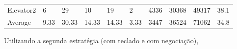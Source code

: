 \documentclass[a4paper]{article}
\begin{document}
\begin{table}[h]
\begin{tabular}{@{}llllllllll@{}}
Elevator2 & 6        & 29            & 10           & 19                                                               & 2                                                                  & 4336                                                         & 30368                                                 & 49317                                                   & 38.1         \\
Average   & 9.33     & 30.33         & 14.33        & 14.33                                                               & 3.33                                                               & 3447                                                         & 36524                                                 & 71062                                                   & 34.8          \\ \bottomrule
\end{tabular}
\end{table}

Utilizando a segunda estratégia (com teclado e com negociação),
\end{document}
